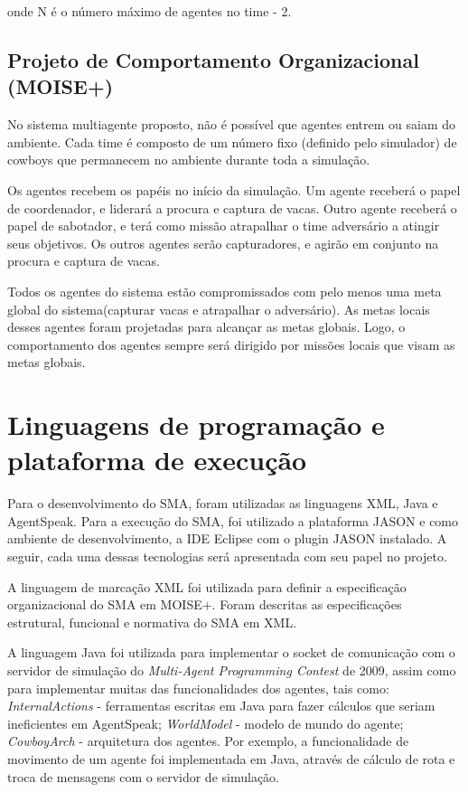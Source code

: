 \documentclass{llncs}
\begin{document}
onde N é o número máximo de agentes no time - 2.

\subsection{Projeto de Comportamento Organizacional (MOISE+)}

No sistema multiagente proposto, não é possível que agentes entrem ou saiam do ambiente. Cada time é composto de um número fixo (definido pelo simulador) de cowboys que permanecem no ambiente durante toda a simulação.

Os agentes recebem os papéis no início da simulação. Um agente receberá o papel de coordenador, e liderará a procura e captura de vacas. Outro agente receberá o papel de sabotador, e terá como missão atrapalhar o time adversário a atingir seus objetivos. Os outros agentes serão capturadores, e agirão em conjunto na procura e captura de vacas.

Todos os agentes do sistema estão compromissados com pelo menos uma meta global do sistema(capturar vacas e atrapalhar o adversário). As metas locais desses agentes foram projetadas para alcançar as metas globais. Logo, o comportamento dos agentes sempre será dirigido por missões locais que visam as metas globais.


\section{Linguagens de programação e plataforma de execução}


Para o desenvolvimento do SMA, foram utilizadas as linguagens XML, Java e AgentSpeak. Para a execução do SMA, foi utilizado a plataforma JASON e como ambiente de desenvolvimento, a IDE Eclipse com o plugin JASON instalado. A seguir, cada uma dessas tecnologias será apresentada com seu papel no projeto.

A linguagem de marcação XML foi utilizada para definir a especificação organizacional do SMA em MOISE+. Foram descritas as especificações estrutural, funcional e normativa do SMA em XML.

A linguagem Java foi utilizada para implementar o socket de comunicação com o servidor de simulação do \textit{Multi-Agent Programming Contest} de 2009, assim como para implementar muitas das funcionalidades dos agentes, tais como: \textit{InternalActions} - ferramentas escritas em Java para fazer cálculos que seriam
ineficientes em AgentSpeak; \textit{WorldModel} - modelo de mundo do agente; \textit{CowboyArch} - arquitetura dos agentes. Por exemplo, a funcionalidade de movimento de um agente foi implementada em Java, através de cálculo de rota e troca de mensagens com o servidor de simulação.
\end{document}
